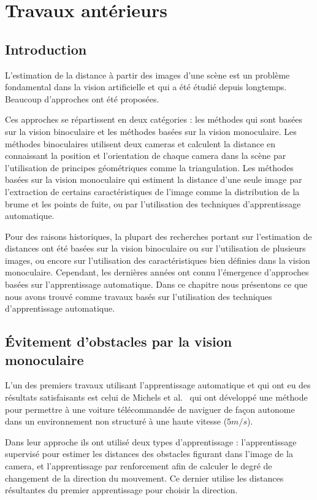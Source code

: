 \chapter{Travaux antérieurs}


\section{Introduction}

L'estimation de la distance à partir des images d'une scène est un problème
fondamental dans la vision artificielle et qui a été étudié depuis longtemps.
Beaucoup d'approches ont été proposées.

Ces approches se répartissent en deux catégories : les méthodes qui sont basées
sur la vision binoculaire et les méthodes basées sur la vision monoculaire.
Les méthodes binoculaires utilisent deux cameras et calculent la distance
en connaissant la position et l'orientation de chaque camera dans la scène
par l'utilisation de principes géométriques comme la triangulation. Les
méthodes basées sur la vision monoculaire qui estiment la distance d'une seule
image par l'extraction de certains caractéristiques de l'image comme la
distribution de la brume et les points de fuite, ou par l'utilisation des
techniques d'apprentissage automatique.

Pour des raisons historiques, la plupart des recherches portant sur l'estimation
de distances ont été basées sur la vision binoculaire ou sur l'utilisation de
plusieurs images, ou encore sur l'utilisation des caractéristiques bien définies
dans la vision monoculaire. Cependant, les dernières années ont connu
l'émergence d'approches basées sur l'apprentissage automatique.
Dans ce chapitre nous présentons ce que nous avons trouvé comme travaux basés
sur l'utilisation des techniques d'apprentissage automatique.

\section{\'Evitement d'obstacles par la vision monoculaire}

L'un des premiers travaux utilisant l'apprentissage automatique et qui ont eu
des résultats satisfaisants est celui de Michels et al.~\cite{michels2005high}
qui ont développé une méthode pour permettre à une voiture télécommandée de
naviguer de façon autonome dans un environnement non structuré à une haute
vitesse ($5m/s$).

Dans leur approche ils ont utilisé deux types d'apprentissage : l'apprentissage
supervisé pour estimer les distances des obstacles figurant dans l'image de la
camera, et l'apprentissage par renforcement afin de calculer le degré de
changement de la direction du mouvement. Ce dernier utilise les distances résultantes
du premier apprentissage pour choisir la direction.


